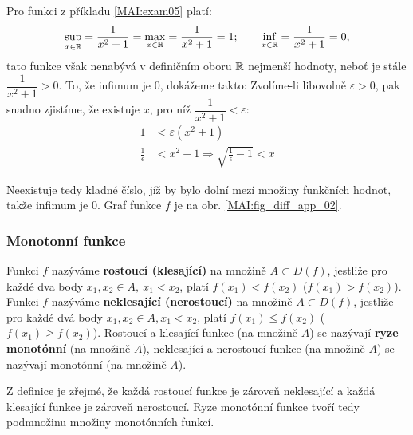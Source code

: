         \begin{example}\label{MAI:exam06}
          Pro funkci z příkladu \ref{MAI:exam05} platí:
          \begin{equation}
            \sup_{x\in\mathbb{R}}=\frac{1}{x^2+1}=\max_{x\in\mathbb{R}}=\frac{1}{x^2+1}=1; \qquad \inf_{x\in\mathbb{R}}=\frac{1}{x^2+1}=0,
          \end{equation}
          tato funkce však nenabývá v definičním oboru $\mathbb{R}$ nejmenší hodnoty, neboť je stále 
          $\dfrac{1}{x^2+1}>0$. To, že infimum je $0$, dokážeme takto: Zvolíme-li libovolně $\varepsilon>0$, 
          pak snadno zjistíme, že existuje $x$, pro níž $\dfrac{1}{x^2+1}<\varepsilon$:
          \begin{align*}
            1                  &< \varepsilon(x^2+1) \\
            \frac{1}{\epsilon} &< x^2+1 \Rightarrow \sqrt{\frac{1}{\epsilon}-1} < x
          \end{align*} 
              
          Neexistuje tedy kladné číslo, jíž by bylo dolní mezí množiny funkčních hodnot, takže infimum je $0$. Graf funkce $f$ je na obr. \ref{MAI:fig_diff_app_02}.
        \end{example}
       
      \subsubsection{Monotonní funkce}
        \begin{definition}\label{MA1:def_lim02}
          Funkci $f$ nazýváme \textbf{rostoucí (klesající)} na množině $A\subset D(f)$, jestliže pro každé 
          dva body $x_1, x_2\in A,\ x_1<x_2$, platí $f(x_1)<f(x_2)$ ($f(x_1)>f(x_2)$). Funkci $f$ nazýváme 
          \textbf{neklesající (nerostoucí)} na množině $A\subset D(f)$, jestliže pro každé dvá body $x_1, 
          x_2\in A,x_1<x_2$, platí $f(x_1)\leq f(x_2)$ ($f(x_1)\geq f(x_2)$). Rostoucí a klesající funkce (na 
          množině $A$) se nazývají \textbf{ryze monotónní} (na množině $A$), neklesající a nerostoucí funkce 
          (na množině $A$) se nazývají monotónní (na množině $A$).    
        \end{definition}
            
        Z definice je zřejmé, že každá rostoucí funkce je zároveň neklesající a každá klesající funkce je 
        zároveň nerostoucí. Ryze monotónní funkce tvoří tedy podmnožinu množiny monotónních funkcí. 
           
